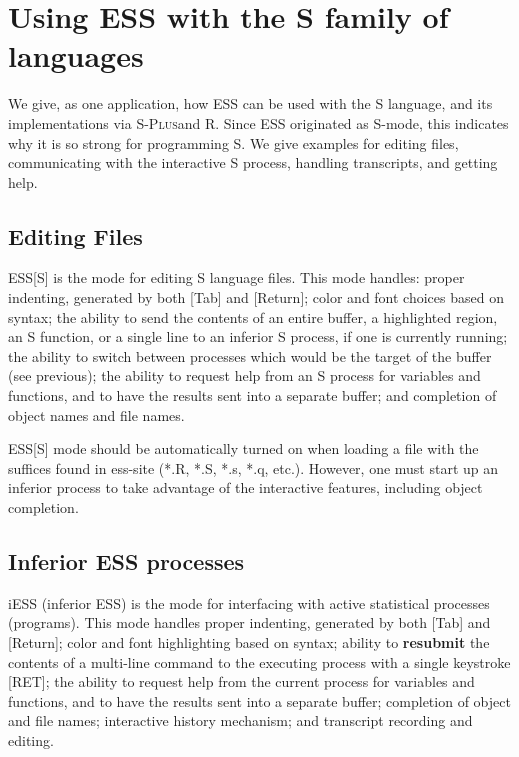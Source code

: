 \documentclass{article}
\newcommand*{\Splus}{\textsc{S-Plus}}
\begin{document}
\section{Using ESS with the S family of languages}
\label{sec:S}

We give, as one application, how ESS can be used with the S language,
and its implementations via \Splus and R.  Since ESS originated as
S-mode, this indicates why it is so strong for programming S.  We give
examples for editing files, communicating with the interactive S
process, handling transcripts, and getting help.

\subsection{Editing Files}
\label{sec:S:edit}

ESS[S] is the mode for editing S language files.  This mode handles:
proper indenting, generated by both [Tab] and [Return]; color and font
choices based on syntax; the ability to send the contents of an entire
buffer, a highlighted region, an S function, or a single line to an
inferior S process, if one is currently running; the ability to switch
between processes which would be the target of the buffer (see
previous); the ability to request help from an S process for variables
and functions, and to have the results sent into a separate buffer;
and completion of object names and file names.

ESS[S] mode should be automatically turned on when loading a file with
the suffices found in ess-site (*.R, *.S, *.s, *.q, etc.).  However,
one must start up an inferior process to take advantage of the
interactive features, including object completion.

\subsection{Inferior ESS processes}
\label{sec:S:inf}

iESS (inferior ESS) is the mode for interfacing with active
statistical processes (programs).  This mode handles proper indenting,
generated by both [Tab] and [Return]; color and font highlighting
based on syntax; ability to \textbf{resubmit} the contents of a
multi-line command to the executing process with a single keystroke
[RET]; the ability to request help from the current process for
variables and functions, and to have the results sent into a separate
buffer; completion of object and file names; interactive history
mechanism; and transcript recording and editing.
\end{document}
